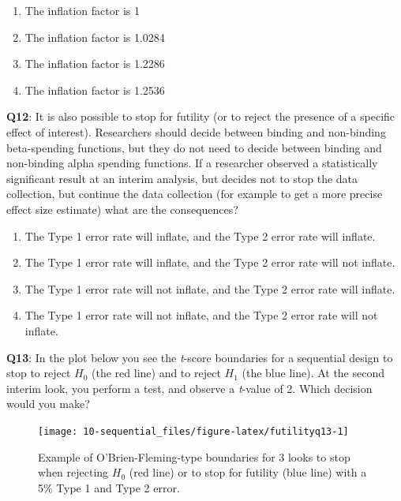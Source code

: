 \documentclass[
  oneside]{krantz}
\providecommand{\tightlist}{%
  \setlength{\itemsep}{0pt}\setlength{\parskip}{0pt}}
\begin{document}
\begin{enumerate}
\def\labelenumi{\Alph{enumi})}
\tightlist
\item
  The inflation factor is 1
\item
  The inflation factor is 1.0284
\item
  The inflation factor is 1.2286
\item
  The inflation factor is 1.2536
\end{enumerate}

\textbf{Q12}: It is also possible to stop for futility (or to reject the presence of a specific effect of interest). Researchers should decide between binding and non-binding beta-spending functions, but they do not need to decide between binding and non-binding alpha spending functions. If a researcher observed a statistically significant result at an interim analysis, but decides not to stop the data collection, but continue the data collection (for example to get a more precise effect size estimate) what are the consequences?

\begin{enumerate}
\def\labelenumi{\Alph{enumi})}
\tightlist
\item
  The Type 1 error rate will inflate, and the Type 2 error rate will inflate.
\item
  The Type 1 error rate will inflate, and the Type 2 error rate will not inflate.
\item
  The Type 1 error rate will not inflate, and the Type 2 error rate will inflate.
\item
  The Type 1 error rate will not inflate, and the Type 2 error rate will not inflate.
\end{enumerate}

\textbf{Q13}: In the plot below you see the \emph{t}-score boundaries for a sequential design to stop to reject \(H_0\) (the red line) and to reject \(H_1\) (the blue line). At the second interim look, you perform a test, and observe a \emph{t}-value of 2. Which decision would you make?



\begin{figure}

{\centering \texttt{[image: 10-sequential\_files/figure-latex/futilityq13-1]} 

}

\caption{Example of O'Brien-Fleming-type boundaries for 3 looks to stop when rejecting \(H_0\) (red line) or to stop for futility (blue line) with a 5\% Type 1 and Type 2 error.}\label{fig:futilityq13}
\end{figure}
\end{document}
